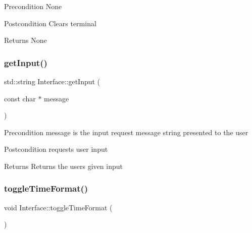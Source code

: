 \begin{DoxyPrecond}{Precondition}
None 
\end{DoxyPrecond}
\begin{DoxyPostcond}{Postcondition}
Clears terminal 
\end{DoxyPostcond}
\begin{DoxyReturn}{Returns}
None 
\end{DoxyReturn}
\mbox{\label{class_interface_aa5c0539404373d488986f030f7a84a6f}} 
\subsubsection{\texorpdfstring{get\+Input()}{getInput()}}
{\footnotesize\ttfamily std\+::string Interface\+::get\+Input (\begin{DoxyParamCaption}\item[{const char $\ast$}]{message }\end{DoxyParamCaption})\hspace{0.3cm}{\ttfamily [static]}}

\begin{DoxyPrecond}{Precondition}
message is the input request message string presented to the user 
\end{DoxyPrecond}
\begin{DoxyPostcond}{Postcondition}
requests user input 
\end{DoxyPostcond}
\begin{DoxyReturn}{Returns}
Returns the user\textquotesingle{}s given input 
\end{DoxyReturn}
\mbox{\label{class_interface_a2e002e61dc11cf4a1bd9c039704194df}} 
\subsubsection{\texorpdfstring{toggle\+Time\+Format()}{toggleTimeFormat()}}
{\footnotesize\ttfamily void Interface\+::toggle\+Time\+Format (\begin{DoxyParamCaption}{ }\end{DoxyParamCaption})\hspace{0.3cm}{\ttfamily [static]}}

